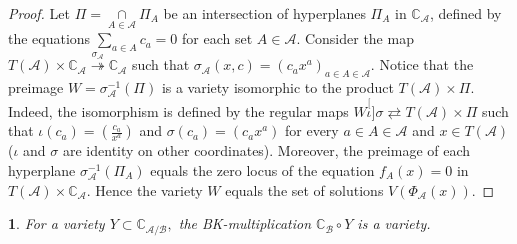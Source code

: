 \documentclass[11pt]{article}
\theoremstyle{plain}
\newtheorem{thm}{\protect\theoremname}[section]
\theoremstyle{definition}
\theoremstyle{remark}
\theoremstyle{plain}
\theoremstyle{plain}
\theoremstyle{plain}
\theoremstyle{definition}
\providecommand{\theoremname}{Theorem}
\begin{document}
\begin{proof}
Let $\Pi=\underset{A\in\mathscr{A}}{\cap}\Pi_{A}$ be an intersection
of hyperplanes $\Pi_{A}$ in $\mathbb{C}_{\mathscr{A}}$, defined
by the equations $\underset{a\in A}{\sum}c_{a}=0$ for each set $A\in\mathscr{A}$.
Consider the map $T(\mathscr{A})\times\mathbb{C}_{\mathscr{A}}\overset{\sigma_{\mathscr{A}}}{\twoheadrightarrow}\mathbb{C}_{\mathscr{A}}$
such that $\sigma_{\mathscr{A}}(x,c)=(c_{a}x^{a})_{a\in A\in\mathscr{A}}.$
Notice that the preimage $W=\sigma_{\mathscr{A}}^{-1}(\Pi)$ is a
variety isomorphic to the product $T(\mathscr{A})\times\Pi.$ Indeed,
the isomorphism is defined by the regular maps $W\stackrel[\iota]{\sigma}{\rightleftarrows}T(\mathscr{A})\times\Pi$
such that $\iota(c_{a})=(\frac{c_{a}}{x^{a}})$ and $\sigma(c_{a})=(c_{a}x^{a})$
for every $a\in A\in\mathscr{A}$ and $x\in T(\mathscr{A})$ ($\iota$
and $\sigma$ are identity on other coordinates). Moreover, the preimage
of each hyperplane $\sigma_{\mathscr{A}}^{-1}(\Pi_{A})$ equals the
zero locus of the equation $f_{A}(x)=0$ in $T(\mathscr{A})\times\mathbb{C}_{\mathscr{A}}$.
Hence the variety $W$ equals the set of solutions $V(\Phi_{\mathscr{A}}(x))$.
\end{proof}
\begin{thm}
\label{Theorem. BK-multiplication of varieties}For a variety $Y\subset\mathbb{C}_{\mathscr{A}/\mathscr{B}},$
the BK-multiplication $\mathbb{C}_{\mathscr{B}}\circ Y$ is a variety.
\end{thm}
\end{document}
